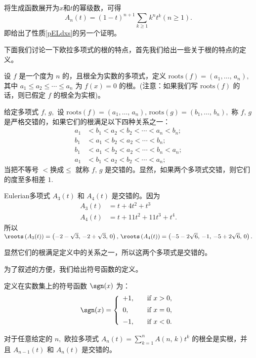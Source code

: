 将生成函数展开为$x$和$t$的幂级数，可得
\begin{equation}\label{Ant}
A_n(t)=(1-t)^{n+1}\sum_{k\geq1}k^nt^k (n\geq1).
\end{equation}
即给出了性质\ref{pELdxs}的另一个证明。




下面我们讨论一下欧拉多项式的根的特点，首先我们给出一些关于根的特点的定义。

设 $f$ 是一个度为 $n$ 的，且根全为实数的多项式，定义
$\mathrm{roots}(f)=\left(a_{1},\ldots,\,a_{n}\right),$ 其中
$a_{1}\leqslant a_{2}\leqslant \cdots \leqslant a_{n}$ 为 $f(x)=0$
的根。(注意：如果我们写 $\mathrm{roots}(f)$ 的话，则已假定 $f$
的根全为实根)。

 \begin{defi} 给定多项式 $f,\,g,$
设 $\mathrm{roots}(f)=\left(a_{1},\ldots,\,a_{n}\right),\,
\mathrm{roots}(g)=\left(b_{1},\ldots,\, b_{n}\right),$ 称 $f,\,g$
是严格交错的，如果它们的根满足以下四种关系之一：
\begin{align*}
 a_{1}&<b_{1}<a_{2}<b_{2}< \cdots <a_{n}<b_{n};\\[5pt]
 b_{1}&<a_{1}<b_{2}< a_{2}< \cdots <b_{n};\\[5pt]
 b_{1}&<a_{1}<b_{2}<a_{2}< \cdots <b_{n}<a_{n};\\[5pt]
 a_{1}&<b_{1}<a_{2}< b_{2}< \cdots <a_{n};
\end{align*}
当把不等号 $<$换成$\leq$ 就称 $f,\,g$
是交错的。显然，如果两个多项式交错，则它们的度至多相差 $1$.
\end{defi}

\begin{exa}
Eulerian多项式 $A_{3}(t)$ 和 $A_{4}(t)$ 是交错的。因为
\begin{align*}
A_3(t) &=t+4t^2+t^3 \\
A_4(t) &=t+11t^2+11t^3+t^4.
\end{align*}
所以$\roots\left(A_{3}(t)\right)=\left(-2-\sqrt{3},\,-2+\sqrt{3},\,0\right),\,
\roots\left(A_{4}(t)\right)=\left(-5-2\sqrt{6},\,-1,\,-5+2\sqrt{6},\,0\right).$

显然它们的根满足定义中的关系之一，所以这两个多项式是交错的。
\end{exa}
为了叙述的方便，我们给出符号函数的定义。
 \begin{defi}
定义在实数集上的符号函数 $\sgn(x)$ 为：
$$ \sgn(x)=\left\{ \begin{array}{ll}
+1, \quad &\textrm{if $x>0,$}\\[5pt]
0 , \quad &\textrm{if $x=0,$}\\[5pt]
-1,  \quad &\textrm{if $x<0.$}
\end{array}\right.
$$
 \end{defi}
 \begin{thm}
对于任意给定的 $n,$ 欧拉多项式 $A_{n}(t)=\sum
_{k=1}^{n}A(n,\,k)t^{k}$ 的根全是实根，并且 $A_{n-1}(t)$ 和
$A_{n}(t)$ 是交错的。
\end{thm}


